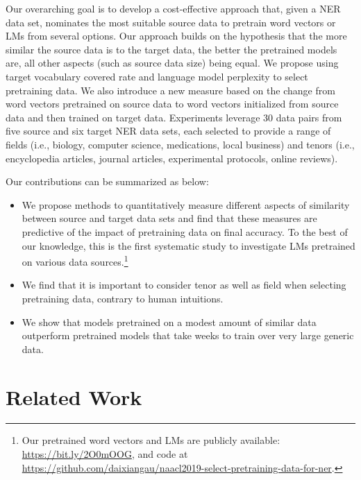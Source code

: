 \documentclass[11pt,a4paper]{article}
\begin{document}
Our overarching goal is to develop a cost-effective approach that, given a NER data set, nominates the most suitable source data to pretrain word vectors or LMs from several options. Our approach builds on the hypothesis that the more similar the source data is to the target data, the better the pretrained models are, all other aspects (such as source data size) being equal.
We propose using target vocabulary covered rate and language model perplexity to select pretraining data. 
We also introduce a new measure based on the change from word vectors pretrained on source data to word vectors initialized from source data and then trained on target data.
Experiments leverage 30 data pairs from five source and six target NER data sets, each selected to provide a range of fields (i.e., biology, computer science, medications, local business) and tenors (i.e., encyclopedia articles, journal articles, experimental protocols, online reviews).

Our contributions can be summarized as below:
\begin{itemize}[noitemsep,topsep=2pt]
\item We propose methods to quantitatively measure different aspects of similarity between source and target data sets and find that these measures are predictive of the impact of pretraining data on final accuracy. 
To the best of our knowledge, this is the first systematic study to investigate LMs pretrained on various data sources.\footnote{Our pretrained word vectors and LMs are publicly available: \href{https://bit.ly/2O0mOOG}{https://bit.ly/2O0mOOG}, and code at \href{https://github.com/daixiangau/naacl2019-select-pretraining-data-for-ner}{https://github.com/daixiangau/naacl2019-select-pretraining-data-for-ner}.}
\item We find that it is important to consider tenor as well as field when selecting pretraining data, contrary to human intuitions.
\item We show that models pretrained on a modest amount of similar data outperform pretrained models that take weeks to train over very large generic data.
\end{itemize}

\section{Related Work}
\end{document}
